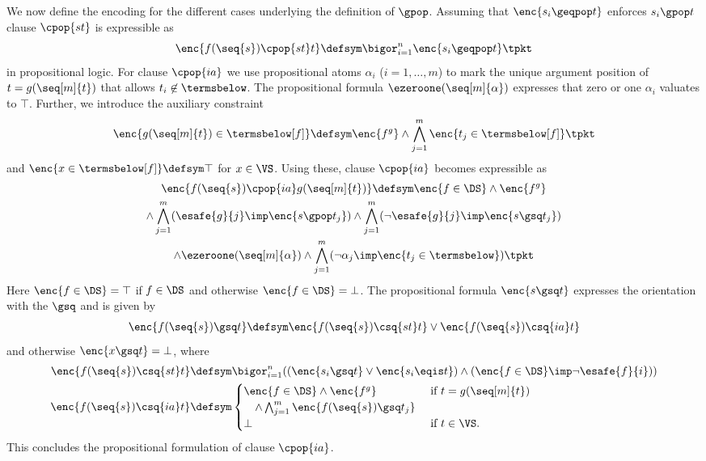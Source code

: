 \documentclass{LMCS}
\begin{document}
We now define the encoding for the different cases underlying the definition of $\gpop$.
Assuming that $\enc{s_i \geqpop t}$ enforces $s_i \gpop t$ clause $\cpop{st}$ is expressible
as 
\begin{equation*}
  \enc{f(\seq{s}) \cpop{st} t} \defsym \bigor_{i=1}^n \enc{s_i \geqpop t}
  \tpkt
\end{equation*}
in propositional logic. 
For clause $\cpop{ia}$ we use propositional atoms $\alpha_i$ ($i = 1,\dots,m$)
to mark the unique argument position of $t = g(\seq[m]{t})$ that allows
$t_i \not\in \termsbelow$. 
The propositional formula $\ezeroone(\seq[m]{\alpha})$ expresses that zero or one
$\alpha_i$ valuates to $\top$. 
Further, we introduce the auxiliary constraint 
\begin{equation*}
\enc{g(\seq[m]{t}) \in \termsbelow[f]} \defsym \enc{f \sp g} \wedge \bigwedge_{j=1}^m \enc{t_j \in \termsbelow[f]}
\tpkt
\end{equation*}
and $\enc{x \in \termsbelow[f]} \defsym \top$ for $x \in \VS$.
Using these, clause $\cpop{ia}$ becomes expressible as 
\begin{multline*}
  \enc{f(\seq{s}) \cpop{ia} g(\seq[m]{t})} \defsym
  \enc{f \in \DS}
  \wedge \enc{f \sp g} \\
  \wedge \bigwedge_{j=1}^m (\esafe{g}{j} \imp \enc{s \gpop t_j})
  \wedge \bigwedge_{j=1}^m (\neg \esafe{g}{j} \imp \enc{s \gsq t_j}) \\
  \wedge \ezeroone(\seq[m]{\alpha}) 
  \wedge \bigwedge_{j=1}^m (\neg \alpha_j \imp \enc{t_j \in \termsbelow}) \tpkt
\end{multline*}
Here $\enc{f \in \DS} = \top$ if $f \in \DS$ and otherwise $\enc{f \in \DS} = \bot$.
The propositional formula $\enc{s \gsq t}$ expresses the orientation with the $\gsq$ and is given by
\begin{align*}
  \enc{f(\seq{s}) \gsq t} \defsym \enc{f(\seq{s}) \csq{st} t} \vee \enc{f(\seq{s}) \csq{ia} t}
\end{align*}
and otherwise $\enc{x \gsq t} = \bot$, where
\begin{align*}
  \enc{f(\seq{s}) \csq{st} t} & \defsym \bigor_{i=1}^n ((\enc{s_i \gsq t} \vee \enc{s_i \eqis t}) \wedge (\enc{f \in \DS} \imp \neg \esafe{f}{i})) \\
  \enc{f(\seq{s}) \csq{ia} t} & \defsym 
  \begin{cases}
    \enc{f \in \DS} \wedge \enc{f \sp g} & \text{ if $t = g(\seq[m]{t})$} \\
    \quad \wedge \bigwedge_{j=1}^m \enc{f(\seq{s}) \gsq t_j} \\
    \bot & \text{ if $t \in \VS$}.
  \end{cases}
\end{align*}
This concludes the propositional formulation of clause $\cpop{ia}$.
\end{document}
